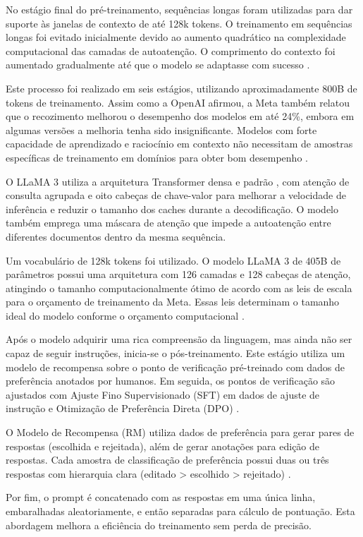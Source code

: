 No estágio final do pré-treinamento, sequências longas foram utilizadas para dar suporte às janelas de contexto de até 128k tokens. O treinamento em sequências longas foi evitado inicialmente devido ao aumento quadrático na complexidade computacional das camadas de autoatenção. O comprimento do contexto foi aumentado gradualmente até que o modelo se adaptasse com sucesso \cite{llama3}.

Este processo foi realizado em seis estágios, utilizando aproximadamente 800B de tokens de treinamento. Assim como a OpenAI afirmou, a Meta também relatou que o recozimento melhorou o desempenho dos modelos em até 24\%, embora em algumas versões a melhoria tenha sido insignificante. Modelos com forte capacidade de aprendizado e raciocínio em contexto não necessitam de amostras específicas de treinamento em domínios para obter bom desempenho \cite{llama3}.

O LLaMA 3 utiliza a arquitetura Transformer densa e padrão \cite{vaswani2017}, com atenção de consulta agrupada \cite{ainslie2023} e oito cabeças de chave-valor para melhorar a velocidade de inferência e reduzir o tamanho dos caches durante a decodificação. O modelo também emprega uma máscara de atenção que impede a autoatenção entre diferentes documentos dentro da mesma sequência.

Um vocabulário de 128k tokens foi utilizado. O modelo LLaMA 3 de 405B de parâmetros possui uma arquitetura com 126 camadas e 128 cabeças de atenção, atingindo o tamanho computacionalmente ótimo de acordo com as leis de escala para o orçamento de treinamento da Meta. Essas leis determinam o tamanho ideal do modelo conforme o orçamento computacional \cite{llama3}.

Após o modelo adquirir uma rica compreensão da linguagem, mas ainda não ser capaz de seguir instruções, inicia-se o pós-treinamento. Este estágio utiliza um modelo de recompensa sobre o ponto de verificação pré-treinado com dados de preferência anotados por humanos. Em seguida, os pontos de verificação são ajustados com Ajuste Fino Supervisionado (SFT) em dados de ajuste de instrução e Otimização de Preferência Direta (DPO) \cite{llama3}.

O Modelo de Recompensa (RM) utiliza dados de preferência para gerar pares de respostas (escolhida e rejeitada), além de gerar anotações para edição de respostas. Cada amostra de classificação de preferência possui duas ou três respostas com hierarquia clara (editado > escolhido > rejeitado) \cite{llama3}.

Por fim, o prompt é concatenado com as respostas em uma única linha, embaralhadas aleatoriamente, e então separadas para cálculo de pontuação. Esta abordagem melhora a eficiência do treinamento sem perda de precisão.

